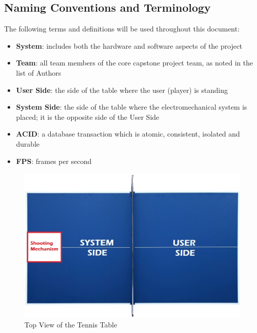 \documentclass[11pt]{article}
\begin{document}
\subsection{Naming Conventions and Terminology}
The following terms and definitions will be used throughout this document:
\begin{itemize}
\item \textbf{System}: includes both the hardware and software aspects of the project
\item \textbf{Team}: all team members of the core capstone project team, as noted in the list of Authors
\item \textbf{User Side}: the side of the table where the user (player) is standing
\item \textbf{System Side}: the side of the table where the electromechanical system is placed; it is the opposite side of the User Side
\item \textbf{ACID}: a database transaction which is atomic, consistent, isolated and durable
\item \textbf{FPS}: frames per second
\end{itemize}
\begin{figure}[H]
   \centering
   \includegraphics[width=\textwidth]{img/table-tennis-top-view.jpeg} %
   \caption{Top View of the Tennis Table}
   \label{fig:table-tennis-top-view}
\end{figure}
\end{document}
